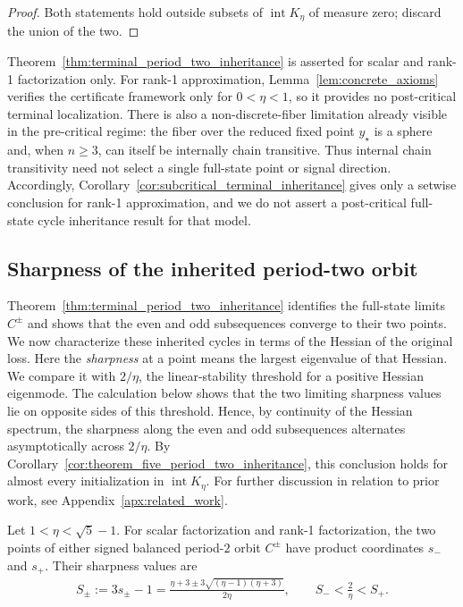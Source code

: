 \documentclass{article}
\begin{document}
\begin{proof}
Both statements hold outside subsets of
$\operatorname{int}K_\eta$ of measure zero; discard the union of the two.
\end{proof}

\begin{remark}
\label{rmk:apx_no_postcritical_inheritance}
Theorem~\ref{thm:terminal_period_two_inheritance} is asserted for scalar and
rank-1 factorization only. For rank-1 approximation,
Lemma~\ref{lem:concrete_axioms} verifies the certificate framework only for
$0<\eta<1$, so it provides no post-critical terminal localization. There is
also a non-discrete-fiber limitation already visible in the pre-critical
regime: the fiber over the reduced fixed point $y_\star$ is a sphere and, when
$n\ge3$, can itself be internally chain transitive. Thus internal chain
transitivity need not select a single full-state point or signal direction.
Accordingly, Corollary~\ref{cor:subcritical_terminal_inheritance} gives only a
setwise conclusion for rank-1 approximation, and we do not assert a
post-critical full-state cycle inheritance result for that model.
\end{remark}

\subsection{Sharpness of the inherited period-two orbit}
\label{subsec:terminal_sharpness}

Theorem~\ref{thm:terminal_period_two_inheritance} identifies the full-state
limits $C^\pm$ and shows that the even and odd subsequences converge to their
two points. We now characterize these inherited cycles in terms of the Hessian
of the original loss. Here the \emph{sharpness} at a point means the largest
eigenvalue of that Hessian. We compare it with $2/\eta$, the linear-stability
threshold for a positive Hessian eigenmode. The calculation below shows that
the two limiting sharpness values lie on opposite sides of this threshold.
Hence, by continuity of the Hessian spectrum, the sharpness along the even and
odd subsequences alternates asymptotically across $2/\eta$. By
Corollary~\ref{cor:theorem_five_period_two_inheritance}, this conclusion holds
for almost every initialization in $\operatorname{int}K_\eta$. For further
discussion in relation to prior work, see Appendix~\ref{apx:related_work}.

\begin{corollary}
\label{cor:period_two_sharpness}
Let $1<\eta<\sqrt5-1$. For scalar factorization and rank-1 factorization, the
two points of either signed balanced period-$2$ orbit $C^\pm$ have product
coordinates $s_-$ and $s_+$. Their sharpness values are
\begin{align}
    S_\pm := 3s_\pm-1
    = \frac{\eta+3\pm3\sqrt{(\eta-1)(\eta+3)}}{2\eta},
    \qquad
    S_-<\frac2\eta<S_+ .
\end{align}
\end{corollary}
\end{document}

